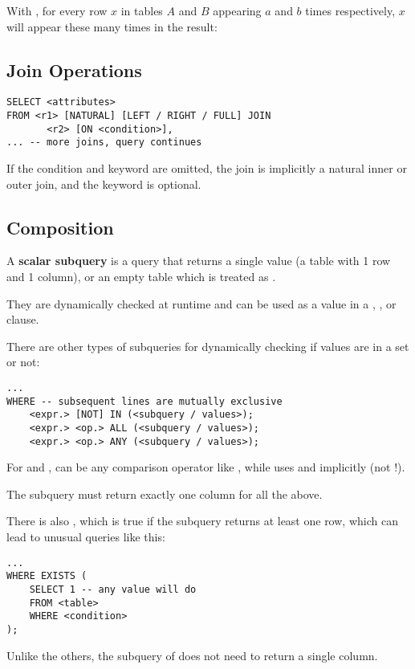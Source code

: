 With , for every row $x$ in tables $A$ and $B$ appearing $a$ and $b$ times respectively,
$x$ will appear these many times in the result:
\begin{itemize}
\end{itemize}

\subsection{Join Operations}
\begin{lstlisting}
SELECT <attributes>
FROM <r1> [NATURAL] [LEFT / RIGHT / FULL] JOIN
       <r2> [ON <condition>],
... -- more joins, query continues
\end{lstlisting}

If the condition and  keyword are omitted, the join is implicitly a natural inner or outer join,
and the  keyword is optional.

\subsection{Composition}
A \textbf{scalar subquery} is a query that returns a single value (a table with 1 row and 1 column),
or an empty table which is treated as .

They are dynamically checked at runtime and can be used as a value in a , ,
or  clause.

There are other types of subqueries for dynamically checking if values are in a set or not:
\begin{lstlisting}
...
WHERE -- subsequent lines are mutually exclusive
    <expr.> [NOT] IN (<subquery / values>);
    <expr.> <op.> ALL (<subquery / values>);
    <expr.> <op.> ANY (<subquery / values>);
\end{lstlisting}

For  and ,  can be any comparison operator like \code{=, <, >, <=, >=, <>},
while  uses \code{=} and \code{<>} implicitly (not !).

The subquery must return exactly one column for all the above.

There is also , which is true if the subquery returns at least one row, which can lead to unusual queries like this:

\begin{lstlisting}
...
WHERE EXISTS (
    SELECT 1 -- any value will do
    FROM <table>
    WHERE <condition>
);
\end{lstlisting}

Unlike the others, the subquery of  does not need to return a single column.